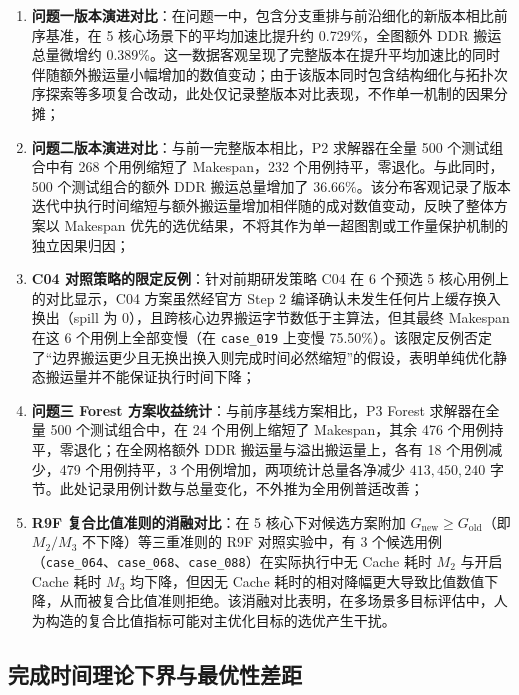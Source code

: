 \documentclass[anonymous,withtoc]{gmcm2026}
\providecommand{\tightlist}{\setlength{\itemsep}{0pt}\setlength{\parskip}{0pt}}
\begin{document}
\begin{enumerate}
\def\labelenumi{\arabic{enumi}.}
\tightlist
\item
  \textbf{问题一版本演进对比}：在问题一中，包含分支重排与前沿细化的新版本相比前序基准，在 5 核心场景下的平均加速比提升约 0.729\%，全图额外 DDR 搬运总量微增约 0.389\%。这一数据客观呈现了完整版本在提升平均加速比的同时伴随额外搬运量小幅增加的数值变动；由于该版本同时包含结构细化与拓扑次序探索等多项复合改动，此处仅记录整版本对比表现，不作单一机制的因果分摊；
\item
  \textbf{问题二版本演进对比}：与前一完整版本相比，P2 求解器在全量 500 个测试组合中有 268 个用例缩短了 Makespan，232 个用例持平，零退化。与此同时，500 个测试组合的额外 DDR 搬运总量增加了 36.66\%。该分布客观记录了版本迭代中执行时间缩短与额外搬运量增加相伴随的成对数值变动，反映了整体方案以 Makespan 优先的选优结果，不将其作为单一超图割或工作量保护机制的独立因果归因；
\item
  \textbf{C04 对照策略的限定反例}：针对前期研发策略 C04 在 6 个预选 5 核心用例上的对比显示，C04 方案虽然经官方 Step 2 编译确认未发生任何片上缓存换入换出（spill 为 0），且跨核心边界搬运字节数低于主算法，但其最终 Makespan 在这 6 个用例上全部变慢（在 \texttt{case\_019} 上变慢 75.50\%）。该限定反例否定了``边界搬运更少且无换出换入则完成时间必然缩短''的假设，表明单纯优化静态搬运量并不能保证执行时间下降；
\item
  \textbf{问题三 Forest 方案收益统计}：与前序基线方案相比，P3 Forest 求解器在全量 500 个测试组合中，在 24 个用例上缩短了 Makespan，其余 476 个用例持平，零退化；在全网格额外 DDR 搬运量与溢出搬运量上，各有 18 个用例减少，479 个用例持平，3 个用例增加，两项统计总量各净减少 \(413{,}450{,}240\) 字节。此处记录用例计数与总量变化，不外推为全用例普适改善；
\item
  \textbf{R9F 复合比值准则的消融对比}：在 5 核心下对候选方案附加 \(G_{\mathrm{new}} \ge G_{\mathrm{old}}\)（即 \(M_2/M_3\) 不下降）等三重准则的 R9F 对照实验中，有 3 个候选用例（\texttt{case\_064}、\texttt{case\_068}、\texttt{case\_088}）在实际执行中无 Cache 耗时 \(M_2\) 与开启 Cache 耗时 \(M_3\) 均下降，但因无 Cache 耗时的相对降幅更大导致比值数值下降，从而被复合比值准则拒绝。该消融对比表明，在多场景多目标评估中，人为构造的复合比值指标可能对主优化目标的选优产生干扰。
\end{enumerate}

\subsection{完成时间理论下界与最优性差距}
\end{document}
